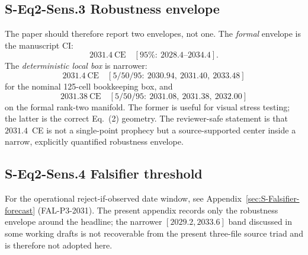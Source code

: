 \documentclass[11pt]{article}
\begin{document}
\subsection*{S-Eq2-Sens.3 Robustness envelope}
\label{sec:S-Eq2-Sens.3}

The paper should therefore report two envelopes, not one. The \emph{formal}
envelope is the manuscript CI:
\[2031.4~\mathrm{CE}\quad [95\%:\ 2028.4\text{--}2034.4].\]
The \emph{deterministic local box} is narrower:
\[2031.4~\mathrm{CE}\quad [5/50/95:\ 2030.94,\ 2031.40,\ 2033.48]\]
for the nominal 125-cell bookkeeping box, and
\[2031.38~\mathrm{CE}\quad [5/50/95:\ 2031.08,\ 2031.38,\ 2032.00]\]
on the formal rank-two manifold. The former is useful for visual stress
testing; the latter is the correct Eq.~(2) geometry. The reviewer-safe
statement is that $2031.4$~CE is not a single-point prophecy but a
source-supported center inside a narrow, explicitly quantified robustness
envelope.

\subsection*{S-Eq2-Sens.4 Falsifier threshold}
\label{sec:S-Eq2-Sens.4}

For the operational reject-if-observed date window, see
Appendix~\ref{sec:S-Falsifier-forecast} (FAL-P3-2031). The present appendix
records only the robustness envelope around the headline; the narrower
$[2029.2,2033.6]$ band discussed in some working drafts is not recoverable
from the present three-file source triad and is therefore not adopted here.





\end{document}
